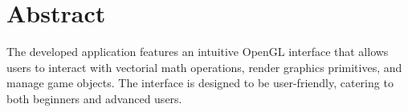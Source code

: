 \part*{Abstract} 

The developed application features an intuitive OpenGL interface that
allows users to interact with vectorial math operations, render graphics
primitives, and manage game objects. The interface is designed to be
user-friendly, catering to both beginners and advanced users.




